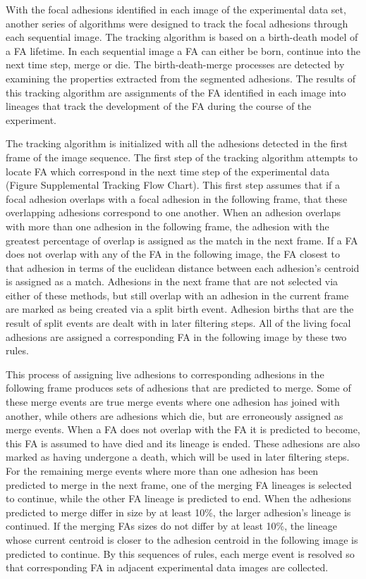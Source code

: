 \documentclass[10pt]{article}
\begin{document}
With the focal adhesions identified in each image of the experimental data set,
another series of algorithms were designed to track the focal adhesions through
each sequential image. The tracking algorithm is based on a birth-death model of
a FA lifetime. In each sequential image a FA can either be born, continue into
the next time step, merge or die. The birth-death-merge processes are detected
by examining the properties extracted from the segmented adhesions. The results
of this tracking algorithm are assignments of the FA identified in each image
into lineages that track the development of the FA during the course of the
experiment.

The tracking algorithm is initialized with all the adhesions detected in the
first frame of the image sequence. The first step of the tracking algorithm
attempts to locate FA which correspond in the next time step of the experimental
data (Figure Supplemental Tracking Flow Chart). This first step assumes that if
a focal adhesion overlaps with a focal adhesion in the following frame, that
these overlapping adhesions correspond to one another. When an adhesion overlaps
with more than one adhesion in the following frame, the adhesion with the
greatest percentage of overlap is assigned as the match in the next frame. If a
FA does not overlap with any of the FA in the following image, the FA closest to
that adhesion in terms of the euclidean distance between each adhesion's
centroid is assigned as a match. Adhesions in the next frame that are not
selected via either of these methods, but still overlap with an adhesion in the
current frame are marked as being created via a split birth event. Adhesion
births that are the result of split events are dealt with in later filtering
steps. All of the living focal adhesions are assigned a corresponding FA in the
following image by these two rules.

This process of assigning live adhesions to corresponding adhesions in the
following frame produces sets of adhesions that are predicted to merge. Some of
these merge events are true merge events where one adhesion has joined with
another, while others are adhesions which die, but are erroneously assigned as
merge events. When a FA does not overlap with the FA it is predicted to become,
this FA is assumed to have died and its lineage is ended. These adhesions are
also marked as having undergone a death, which will be used in later filtering
steps. For the remaining merge events where more than one adhesion has been
predicted to merge in the next frame, one of the merging FA lineages is selected
to continue, while the other FA lineage is predicted to end. When the adhesions
predicted to merge differ in size by at least 10\%, the larger adhesion's
lineage is continued. If the merging FAs sizes do not differ by at least 10\%,
the lineage whose current centroid is closer to the adhesion centroid in the
following image is predicted to continue. By this sequences of rules, each merge
event is resolved so that corresponding FA in adjacent experimental data images
are collected.
\end{document}
